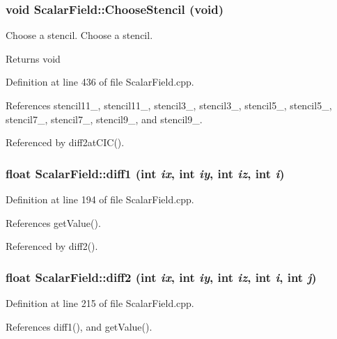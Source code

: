 \subsubsection[{ChooseStencil}]{\setlength{\rightskip}{0pt plus 5cm}void ScalarField::ChooseStencil (void)}\label{classScalarField_a18e4f67a70252f244786b18eca1b3f6d}


Choose a stencil. Choose a stencil. 

\begin{DoxyReturn}{Returns}
void 
\end{DoxyReturn}


Definition at line 436 of file ScalarField.cpp.



References stencil11\_, stencil11\_, stencil3\_, stencil3\_, stencil5\_, stencil5\_, stencil7\_, stencil7\_, stencil9\_, and stencil9\_.



Referenced by diff2atCIC().

\subsubsection[{diff1}]{\setlength{\rightskip}{0pt plus 5cm}float ScalarField::diff1 (int {\em ix}, \/  int {\em iy}, \/  int {\em iz}, \/  int {\em i})}\label{classScalarField_acfad6a7264af1af97387a84e325b13b1}


Definition at line 194 of file ScalarField.cpp.



References getValue().



Referenced by diff2().

\subsubsection[{diff2}]{\setlength{\rightskip}{0pt plus 5cm}float ScalarField::diff2 (int {\em ix}, \/  int {\em iy}, \/  int {\em iz}, \/  int {\em i}, \/  int {\em j})}\label{classScalarField_a2fcdbd62e44204d7ce1b056e8aa8fa55}


Definition at line 215 of file ScalarField.cpp.



References diff1(), and getValue().



